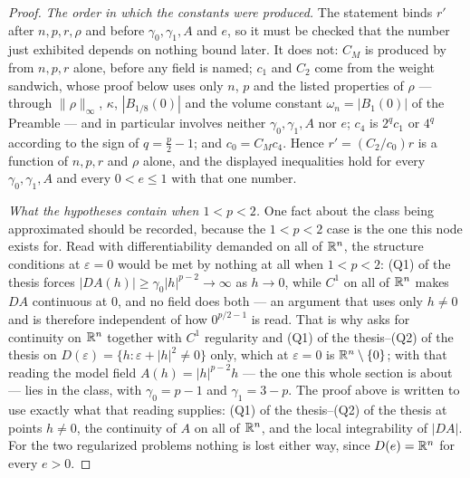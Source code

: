 \begin{proof}
\emph{The order in which the constants were produced.}  The statement binds
$r'$ after $n,p,r,\rho$ and before $\gamma_0,\gamma_1,A$ and $e$, so it must be
checked that the number just exhibited depends on nothing bound later.  It does
not: $C_M$ is produced by  from $n,p,r$
alone, before any field is named; $c_1$ and $C_2$ come from the weight
sandwich, whose proof below uses only $n$, $p$ and the listed properties of
$\rho$ --- through $\|\rho\|_\infty$, $\kappa$, $|B_{1/8}(0)|$ and the volume
constant $\omega_n=|B_1(0)|$ of the Preamble --- and in particular involves
neither $\gamma_0,\gamma_1,A$ nor $e$; $c_4$ is $2^qc_1$ or $4^q$ according to
the sign of $q=\tfrac p2-1$; and $c_0=C_Mc_4$.  Hence
$r'=(C_2/c_0)r$ is a function of $n,p,r$ and $\rho$ alone, and the
displayed inequalities hold for every $\gamma_0,\gamma_1,A$ and every
$0<e\le1$ with that one number.

\emph{What the hypotheses contain when $1<p<2$.}  One fact about the class being
approximated should be recorded, because the $1<p<2$ case is the one this node
exists for.  Read with differentiability demanded on all of $\mathbb{R}^n$, the
structure conditions at $\varepsilon=0$ would be met by nothing at all when
$1<p<2$: (Q1) of the thesis forces $|DA(h)|\ge\gamma_0|h|^{p-2}\to\infty$ as
$h\to0$, while $C^1$ on all of $\mathbb{R}^n$ makes $DA$ continuous at $0$, and no field
does both --- an argument that uses only $h\ne0$ and is therefore independent of
how $0^{p/2-1}$ is read.  That is why  asks for
continuity on $\mathbb{R}^n$ together with $C^1$ regularity and
(Q1) of the thesis--(Q2) of the thesis on $D(\varepsilon)=\{h:\varepsilon+|h|^2\ne0\}$
only, which at $\varepsilon=0$ is $\mathbb{R}^n\setminus\{0\}$; with that reading the
model field $A(h)=|h|^{p-2}h$ --- the one this whole section is about --- lies in
the class, with $\gamma_0=p-1$ and $\gamma_1=3-p$.  The proof above is written to
use exactly what that reading supplies: (Q1) of the thesis--(Q2) of the thesis at points
$h\ne0$, the continuity of $A$ on all of $\mathbb{R}^n$, and the local integrability of
$|DA|$.  For the two regularized problems nothing is lost either way, since
$D(e)=\mathbb{R}^n$ for every $e>0$.

\end{proof}
